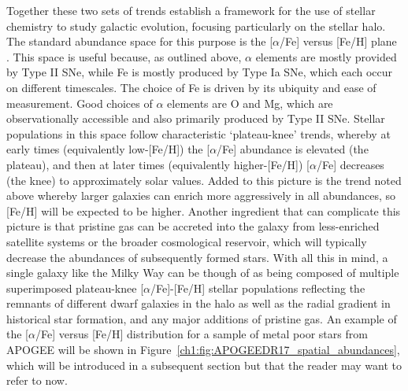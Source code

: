 Together these two sets of trends establish a framework for the use of stellar chemistry to study galactic evolution, focusing particularly on the stellar halo. The standard abundance space for this purpose is the [$\alpha$/Fe] versus [Fe/H] plane \parencite[e.g.][]{hawkins15}. This space is useful because, as outlined above, $\alpha$ elements are mostly provided by Type II SNe, while Fe is mostly produced by Type Ia SNe, which each occur on different timescales. The choice of Fe is driven by its ubiquity and ease of measurement. Good choices of $\alpha$ elements are O and Mg, which are observationally accessible and also primarily produced by Type II SNe. Stellar populations in this space follow characteristic `plateau-knee' trends, whereby at early times (equivalently low-[Fe/H]) the [$\alpha$/Fe] abundance is elevated (the plateau), and then at later times (equivalently higher-[Fe/H]) [$\alpha$/Fe] decreases (the knee) to approximately solar values. Added to this picture is the trend noted above whereby larger galaxies can enrich more aggressively in all abundances, so [Fe/H] will be expected to be higher. Another ingredient that can complicate this picture is that pristine gas can be accreted into the galaxy from less-enriched satellite systems or the broader cosmological reservoir, which will typically decrease the abundances of subsequently formed stars. With all this in mind, a single galaxy like the Milky Way can be though of as being composed of multiple superimposed plateau-knee [$\alpha$/Fe]-[Fe/H] stellar populations reflecting the remnants of different dwarf galaxies in the halo as well as the radial gradient in historical star formation, and any major additions of pristine gas. An example of the [$\alpha$/Fe] versus [Fe/H] distribution for a sample of metal poor stars from APOGEE \parencite{apogee} will be shown in Figure~\ref{ch1:fig:APOGEEDR17_spatial_abundances}, which will be introduced in a subsequent section but that the reader may want to refer to now.

